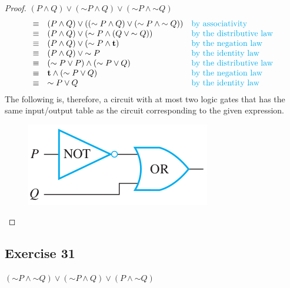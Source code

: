 \documentclass[14pt]{extarticle}
\begin{document}
\begin{proof} $(P \wedge Q) \vee ({\sim P} \wedge Q) \vee ({\sim P} \wedge {\sim
Q})$ $$ \begin{array}{cll} \equiv & (P \wedge Q) \vee (({\sim P} \wedge Q) \vee
({\sim P} \wedge {\sim Q})) & \text{\color{cyan}by associativity} \\ \equiv & (P
\wedge Q) \vee ({\sim P} \wedge (Q \vee {\sim Q})) & \text{\color{cyan}by the
distributive law} \\ \equiv & (P \wedge Q) \vee ({\sim P} \wedge {\bf t}) &
\text{\color{cyan}by the negation law} \\ \equiv & (P \wedge Q) \vee {\sim P} &
\text{\color{cyan}by the identity law} \\ \equiv & ({\sim P} \vee P) \wedge
({\sim P} \vee Q) & \text{\color{cyan}by the distributive law} \\ \equiv & {\bf t}
\wedge ({\sim P} \vee Q) & \text{\color{cyan}by the negation law} \\ \equiv &
{\sim P} \vee Q & \text{\color{cyan}by the identity law} \\ \end{array} $$ The
following is, therefore, a circuit with at most two logic gates that has the
same input/output table as the circuit corresponding to the given expression.
\begin{figure}[ht!] \centering \includegraphics[scale=0.5]{../images/2.4.30.png}
\end{figure} \end{proof}

\subsection{Exercise 31} $({\sim P} \wedge {\sim Q}) \vee ({\sim P} \wedge Q)
\vee (P \wedge {\sim Q})$
\end{document}
